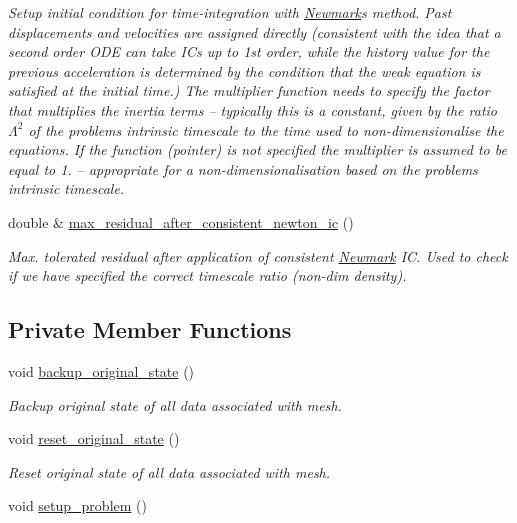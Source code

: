 \begin{DoxyCompactItemize}
\begin{DoxyCompactList}\small\item\em Setup initial condition for time-\/integration with \hyperlink{classoomph_1_1Newmark}{Newmark}\textquotesingle{}s method. Past displacements and velocities are assigned directly (consistent with the idea that a second order O\+DE can take I\+Cs up to 1st order, while the history value for the previous acceleration is determined by the condition that the weak equation is satisfied at the initial time.) The multiplier function needs to specify the factor that multiplies the inertia terms -- typically this is a constant, given by the ratio $ \Lambda^2 $ of the problem\textquotesingle{}s intrinsic timescale to the time used to non-\/dimensionalise the equations. If the function (pointer) is not specified the multiplier is assumed to be equal to 1. -- appropriate for a non-\/dimensionalisation based on the problem\textquotesingle{}s intrinsic timescale. \end{DoxyCompactList}\item 
double \& \hyperlink{classoomph_1_1SolidICProblem_a350a8f545512d81ad6370f46cf0fafed}{max\+\_\+residual\+\_\+after\+\_\+consistent\+\_\+newton\+\_\+ic} ()
\begin{DoxyCompactList}\small\item\em Max. tolerated residual after application of consistent \hyperlink{classoomph_1_1Newmark}{Newmark} IC. Used to check if we have specified the correct timescale ratio (non-\/dim density). \end{DoxyCompactList}\end{DoxyCompactItemize}
\subsection*{Private Member Functions}
\begin{DoxyCompactItemize}
\item 
void \hyperlink{classoomph_1_1SolidICProblem_a14343410dca129169282dd6d5081813d}{backup\+\_\+original\+\_\+state} ()
\begin{DoxyCompactList}\small\item\em Backup original state of all data associated with mesh. \end{DoxyCompactList}\item 
void \hyperlink{classoomph_1_1SolidICProblem_aa2cb88ac90e7d24cdd63a08a8a35eed6}{reset\+\_\+original\+\_\+state} ()
\begin{DoxyCompactList}\small\item\em Reset original state of all data associated with mesh. \end{DoxyCompactList}\item 
void \hyperlink{classoomph_1_1SolidICProblem_a4bbb8c404d1f4ea3827a2c64ae9e06de}{setup\+\_\+problem} ()
\end{DoxyCompactItemize}
